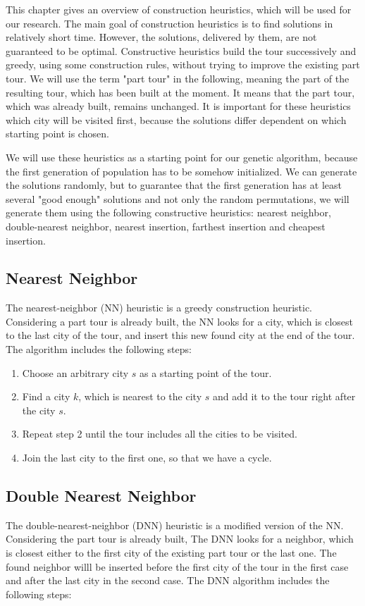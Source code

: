\documentclass[a4paper, 12pt, headings=standardclasses]{scrartcl}
\begin{document}
This chapter gives an overview of construction heuristics, which will be used for our research. The main goal of construction heuristics is to find solutions in relatively short time. However, the solutions, delivered by them, are not guaranteed to be optimal.  Constructive heuristics build the tour successively and greedy, using some construction rules, without trying to improve the existing part tour. We will use the term "part tour" in the following, meaning the part of the resulting tour, which has been built at the moment.  It means that the part tour, which was already built, remains unchanged. It is important for these heuristics which city will be visited first, because the solutions differ dependent on which starting point is chosen. \par
We will use these heuristics as a starting point for our genetic algorithm, because the first generation of population has to be somehow initialized. We can generate the solutions randomly, but to guarantee that the first generation has at least several "good enough" solutions and not only the random permutations, we will generate them using the following constructive heuristics: nearest neighbor, double-nearest neighbor, nearest insertion, farthest insertion and cheapest insertion.

\subsection{Nearest Neighbor}

The nearest-neighbor (NN) heuristic is a greedy construction heuristic.  Considering a part tour is already built, the NN  looks for a city, which is closest to the last city of the tour, and insert this new found city at the end of the tour.
The algorithm includes the following steps:
\begin{enumerate}
	\item Choose an arbitrary city $s$ as a starting point of the tour.
	\item  Find a city $k$, which is nearest to the city $s$ and add it to the tour right after the city $s$.
	\item Repeat step 2 until the tour includes all the cities to be visited.
	\item Join the last city to the first one, so that we have a cycle.
\end{enumerate}

\subsection{Double Nearest Neighbor}
The double-nearest-neighbor (DNN) heuristic is a modified version of the NN. Considering the part tour is already built, The DNN looks for a neighbor, which is closest either to the first city of the existing part tour or the last one. The found neighbor willl be inserted before the first city of the tour in the first case and after the last city in the second case.
The DNN algorithm includes the following steps:
\end{document}
